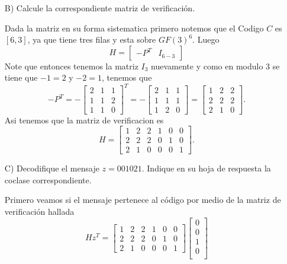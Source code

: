 \begin{itemize}
\begin{sols}
    \end{sols}
    \item[B)] Calcule la correspondiente matriz de verificación.
    \begin{sols}
        Dada la matriz en su forma sistematica primero notemos que el Codigo $C$ es $[6,3]$, ya que tiene tres filas y esta sobre $GF(3)^6$. Luego
        $$H=[\begin{array}{c|c}
            -P^T&I_{6-3}
        \end{array}]$$
        Note que entonces tenemos la matriz $I_3$ nuevamente y como en modulo 3 se tiene que $-1=2$ y $-2=1$, tenemos que
        $$-P^T=-\begin{bmatrix} 2 & 1 & 1 \\ 1 & 1 & 2 \\ 1 & 1 & 0 \end{bmatrix}^T=-\begin{bmatrix} 2 & 1 & 1 \\ 1 & 1 & 1 \\ 1 & 2 & 0 \end{bmatrix}=\begin{bmatrix} 1 & 2 & 2 \\ 2 & 2 & 2 \\ 2 & 1 & 0 \end{bmatrix}.$$
        Asi tenemos que la matriz de verificacion es
        $$H=\begin{bmatrix}
            1 & 2 & 2 & 1 & 0 & 0\\ 2 & 2 & 2 & 0 & 1 & 0\\ 2 & 1 & 0 & 0 & 0 & 1
        \end{bmatrix}.$$
    \end{sols}
    \item[C)] Decodifique el mensaje $z = 001021$. Indique en su hoja de respuesta la coclase correspondiente.
    \begin{sols}
        Primero veamos si el mensaje pertenece al código por medio de la matriz de verificación hallada
        $$Hz^T=\begin{bmatrix}
            1 & 2 & 2 & 1 & 0 & 0\\ 2 & 2 & 2 & 0 & 1 & 0\\ 2 & 1 & 0 & 0 & 0 & 1
        \end{bmatrix}\begin{bmatrix}
            0\\
            0\\
            1\\
            0\\

\end{bmatrix}$$
\end{sols}
\end{itemize}
